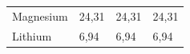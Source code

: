 {\begin{tabular}[t]{|l|l|l|l|}
    
        Magnesium &
    
    
        24,31 &
    
    
        24,31 &
    
    
        24,31%
     \tabularnewline\cline{1-1}\cline{2-2}\cline{3-3}\cline{4-4}
    
    
        Lithium &
    
    
        6,94 &
    
    
        6,94 &
    
    
        6,94%
     \tabularnewline\cline{1-1}\cline{2-2}\cline{3-3}\cline{4-4}
    

\end{tabular}}
